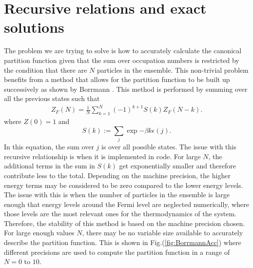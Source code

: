 \section{Recursive relations and exact solutions}
The problem we are trying to solve is how to accurately calculate the canonical partition function given that the sum over occupation numbers is restricted by the condition that there are $N$ particles in the ensemble. This non-trivial problem benefits from a method that allows for the partition function to be built up successively as shown by Borrmann \cite{Borr1993}. This method is performed by summing over all the previous states such that 
\begin{gather}
    Z_F(N)=\frac{1}{N}\sum_{k=1}^N (-1)^{k+1} S(k)Z_F(N-k). \label{Borrmann}
\end{gather}
where $Z(0)=1$ and 
\begin{equation}
    S(k):=\sum_j \exp{-\beta k \epsilon(j)}.
\end{equation}
In this equation, the sum over $j$ is over all possible states. The issue with this recursive relationship is when it is implemented in code. For large $N$, the additional terms in the sum in $S(k)$ get exponentially smaller and therefore contribute less to the total. Depending on the machine precision, the higher energy terms may be considered to be zero compared to the lower energy levels. The issue with this is when the number of particles in the ensemble is large enough that energy levels around the Fermi level are neglected numerically, where those levels are the most relevant ones for the thermodynamics of the system. Therefore, the stability of this method is based on the machine precision chosen. For large enough values $N$, there may be no variable size available to accurately describe the partition function. This is shown in Fig.\@ (\ref{fig:BorrmannAcc}) where different precisions are used to compute the partition function in a range of $N=0$ to $10$.
